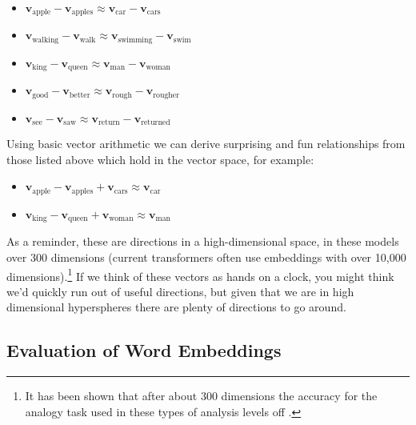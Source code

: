 \begin{itemize}
  \item $\textbf{v}_\text{apple} - \textbf{v}_\text{apples} \approx \textbf{v}_\text{car} - \textbf{v}_\text{cars}$
  \item $\textbf{v}_\text{walking} - \textbf{v}_\text{walk} \approx \textbf{v}_\text{swimming} - \textbf{v}_\text{swim}$
  \item $\textbf{v}_\text{king} - \textbf{v}_\text{queen} \approx \textbf{v}_\text{man} - \textbf{v}_\text{woman}$
  \item $\textbf{v}_\text{good} - \textbf{v}_\text{better} \approx \textbf{v}_\text{rough} - \textbf{v}_\text{rougher}$
  \item $\textbf{v}_\text{see} - \textbf{v}_\text{saw} \approx \textbf{v}_\text{return} - \textbf{v}_\text{returned}$
\end{itemize}

Using basic vector arithmetic we can derive surprising and fun relationships from those listed above which hold in the vector space, for example:

\begin{itemize}
  \item $\textbf{v}_\text{apple} - \textbf{v}_\text{apples} + \textbf{v}_\text{cars} \approx \textbf{v}_\text{car} $
  \item $\textbf{v}_\text{king} - \textbf{v}_\text{queen} + \textbf{v}_\text{woman} \approx  \textbf{v}_\text{man}$
\end{itemize}

As a reminder, these are directions in a high-dimensional space, in these models over 300 dimensions (current transformers often use embeddings with over 10,000 dimensions).\footnote{It has been shown that after about 300 dimensions the accuracy for the analogy task used in these types of analysis levels off \cite{pennington2014glove}.}  If we think of these vectors as hands on a clock, you might think we'd quickly run out of useful directions, but given that we are in high dimensional hyperspheres there are plenty of directions to go around.


\subsection{Evaluation of Word Embeddings}


